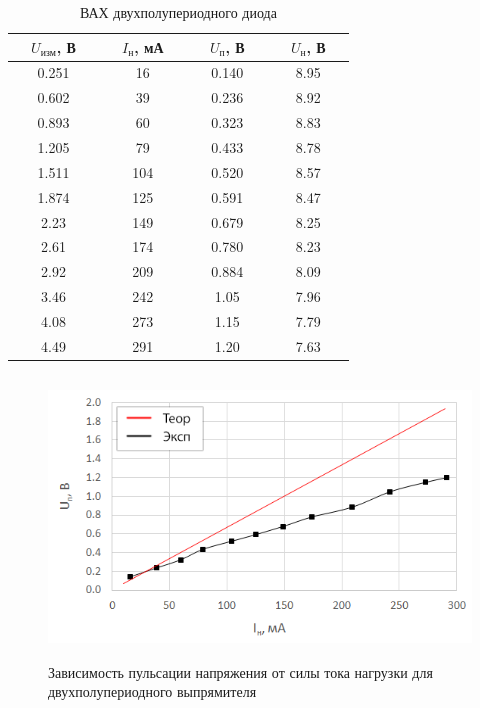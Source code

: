 \begin{table}[H]
	\begin{center}
	\caption{ВАХ двухполупериодного диода}
	\def\arraystretch{1.0}
		\begin{tabular}{|c|c|c|c|}
		\hline 
		\ \ $U_\text{изм}$, В\ \  & \ \ $I_\text{н}$, мА\ \  & \ \ $U_\text{п}$, В\ \  & \ \ $U_\text{н}$, В\ \  \\ \hline
		0.251 & 16 & 0.140 & 8.95 \\ \hline
		0.602 & 39 & 0.236 & 8.92 \\ \hline
		0.893 & 60 & 0.323 & 8.83 \\ \hline
		1.205 & 79 & 0.433 & 8.78 \\ \hline
		1.511 & 104 & 0.520 & 8.57 \\ \hline
		1.874 & 125 & 0.591 & 8.47 \\ \hline
		2.23 & 149 & 0.679 & 8.25 \\ \hline
		2.61 & 174 & 0.780 & 8.23 \\ \hline
		2.92 & 209 & 0.884 & 8.09 \\ \hline
		3.46 & 242 & 1.05 & 7.96 \\ \hline
		4.08 & 273 & 1.15 & 7.79 \\ \hline
		4.49 & 291 & 1.20 & 7.63 \\ \hline
		\end{tabular} 
		\label{tab:5:3}
	\end{center}
\end{table}

\begin{figure}[H]
	\begin{center}
		\includegraphics[height=7.5cm]{img/4}
		\caption{Зависимость пульсации напряжения от силы тока нагрузки для двухполупериодного выпрямителя}
		\label{g:4} %
	\end{center}
\end{figure}

